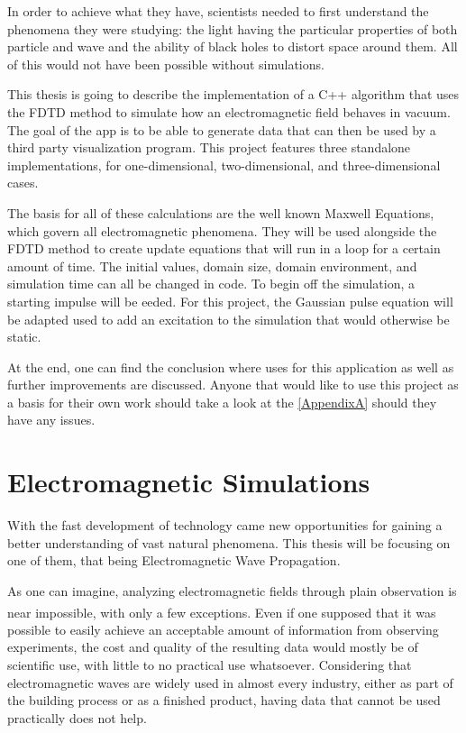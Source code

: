 In order to achieve what they have, scientists needed to first understand the phenomena they were studying: the light having the particular properties of both particle and wave and the ability of black holes to distort space around them. All of this would not have been possible without simulations. 

This thesis is going to describe the implementation of a C++ algorithm that uses the FDTD method to simulate how an electromagnetic field behaves in vacuum. The goal of the app is to be able to generate data that can then be used by a third party visualization program. This project features three standalone implementations, for one-dimensional, two-dimensional, and three-dimensional cases.

The basis for all of these calculations are the well known Maxwell Equations, which govern all electromagnetic phenomena. They will be used alongside the FDTD method to create update equations that will run in a loop for a certain amount of time. The initial values, domain size, domain environment, and simulation time can all be changed in code. To begin off the simulation, a starting impulse will be eeded. For this project, the Gaussian pulse equation will be adapted used to add an excitation to the simulation that would otherwise be static. 

At the end, one can find the conclusion where uses for this application as well as further improvements are discussed. Anyone that would like to use this project as a basis for their own work should take a look at the \ref{AppendixA} should they have any issues.


\section{Electromagnetic Simulations}
With the fast development of technology came new opportunities for gaining a better understanding of vast natural phenomena. This thesis will be focusing on one of them, that being Electromagnetic Wave Propagation. 

As one can imagine, analyzing electromagnetic fields through plain observation is near impossible, with only a few exceptions\textsuperscript{\cite{cao2005first}}. Even if one supposed that it was possible to easily achieve an acceptable amount of information from observing experiments, the cost and quality of the resulting data would mostly be of scientific use, with little to no practical use whatsoever. Considering that electromagnetic waves are widely used in almost every industry, either as part of the building process or as a finished product, having data that cannot be used practically does not help. 


